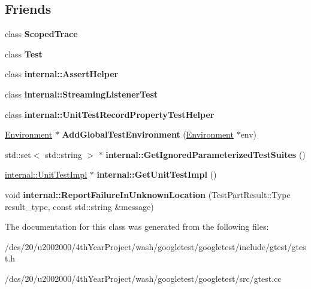 \subsection*{Friends}
\begin{DoxyCompactItemize}
\item 
\mbox{\label{classtesting_1_1UnitTest_ada54bdd5bdc24f39b9ca16807326654a}} 
class {\bfseries Scoped\+Trace}
\item 
\mbox{\label{classtesting_1_1UnitTest_a5b78b1c2e1fa07ffed92da365593eaa4}} 
class {\bfseries Test}
\item 
\mbox{\label{classtesting_1_1UnitTest_a183151aa061362c87572e743fe233db1}} 
class {\bfseries internal\+::\+Assert\+Helper}
\item 
\mbox{\label{classtesting_1_1UnitTest_adc037d188dab349a94868991955c9cd4}} 
class {\bfseries internal\+::\+Streaming\+Listener\+Test}
\item 
\mbox{\label{classtesting_1_1UnitTest_ae970f89a9f477a349fe5778be85ef42e}} 
class {\bfseries internal\+::\+Unit\+Test\+Record\+Property\+Test\+Helper}
\item 
\mbox{\label{classtesting_1_1UnitTest_a5ec26e4c31220ff8e769cc09689a4d6d}} 
\mbox{\hyperlink{classtesting_1_1Environment}{Environment}} $\ast$ {\bfseries Add\+Global\+Test\+Environment} (\mbox{\hyperlink{classtesting_1_1Environment}{Environment}} $\ast$env)
\item 
\mbox{\label{classtesting_1_1UnitTest_a10a8ae91fd7f514eff96a6330343e775}} 
std\+::set$<$ std\+::string $>$ $\ast$ {\bfseries internal\+::\+Get\+Ignored\+Parameterized\+Test\+Suites} ()
\item 
\mbox{\label{classtesting_1_1UnitTest_a56e56be7066957d612e53b5c60f6ac08}} 
\mbox{\hyperlink{classtesting_1_1internal_1_1UnitTestImpl}{internal\+::\+Unit\+Test\+Impl}} $\ast$ {\bfseries internal\+::\+Get\+Unit\+Test\+Impl} ()
\item 
\mbox{\label{classtesting_1_1UnitTest_a73f5a158c13793b90c80d854c9a75120}} 
void {\bfseries internal\+::\+Report\+Failure\+In\+Unknown\+Location} (Test\+Part\+Result\+::\+Type result\+\_\+type, const std\+::string \&message)
\end{DoxyCompactItemize}


The documentation for this class was generated from the following files\+:\begin{DoxyCompactItemize}
\item 
/dcs/20/u2002000/4th\+Year\+Project/wash/googletest/googletest/include/gtest/gtest.\+h\item 
/dcs/20/u2002000/4th\+Year\+Project/wash/googletest/googletest/src/gtest.\+cc\end{DoxyCompactItemize}
